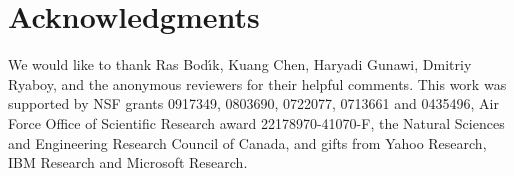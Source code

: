 \section*{Acknowledgments}
We would like to thank Ras Bod\'{\i}k, Kuang Chen, Haryadi Gunawi, Dmitriy
Ryaboy, and the anonymous reviewers for their helpful comments. This work was
supported by NSF grants 0917349, 0803690, 0722077, 0713661 and 0435496, Air
Force Office of Scientific Research award 22178970-41070-F, the Natural Sciences
and Engineering Research Council of Canada, and gifts from Yahoo Research, IBM
Research and Microsoft Research.
